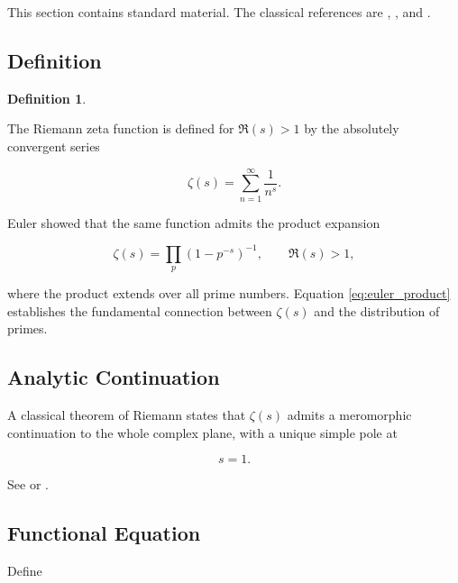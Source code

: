 \documentclass[11pt]{amsart}
\numberwithin{equation}{section}
\theoremstyle{plain}
\theoremstyle{definition}
\newtheorem{definition}[theorem]{Definition}
\theoremstyle{remark}
\begin{document}
This section contains standard material.
The classical references are
\cite{Titchmarsh1986},
\cite{Edwards2001},
and
\cite{IwaniecKowalski2004}.

\subsection{Definition}
\label{subsec:zeta_definition}

\begin{definition}
\label{def:zeta_function}

The Riemann zeta function is defined for
$\Re(s)>1$
by the absolutely convergent series

\begin{equation}
\zeta(s)
=
\sum_{n=1}^{\infty}
\frac{1}{n^{s}}.
\label{eq:zeta_dirichlet_series}
\end{equation}

\end{definition}

Euler showed that the same function admits the product expansion

\begin{equation}
\zeta(s)
=
\prod_{p}
\left(
1-p^{-s}
\right)^{-1},
\qquad
\Re(s)>1,
\label{eq:euler_product}
\end{equation}

where the product extends over all prime numbers.
Equation
\eqref{eq:euler_product}
establishes the fundamental connection between
$\zeta(s)$
and the distribution of primes.

\subsection{Analytic Continuation}
\label{subsec:analytic_continuation}

A classical theorem of Riemann states that
$\zeta(s)$
admits a meromorphic continuation to the whole complex plane,
with a unique simple pole at

\begin{equation}
s=1.
\label{eq:zeta_pole}
\end{equation}

See
\cite{Edwards2001}
or
\cite{Titchmarsh1986}.

\subsection{Functional Equation}
\label{subsec:functional_equation}

Define
\end{document}
